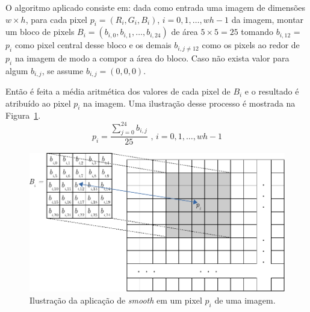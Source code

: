 O algoritmo aplicado consiste em: dada como entrada uma imagem de dimensões $w \times h$, para cada pixel $p_i = (R_i, G_i, B_i)$, $i = 0, 1, \dots, w h - 1$ da imagem, montar um bloco de pixels $B_i = (b_{i,0}, b_{i,1}, \dots, b_{i,24})$ de área $5 \times 5 = 25$ tomando $b_{i,12}$ = $p_i$ como pixel central desse bloco e os demais $b_{i,j \neq 12}$ como os pixels ao redor de $p_i$ na imagem de modo a compor a área do bloco. Caso não exista valor para algum $b_{i,j}$, se assume $b_{i,j} = (0,0,0)$.

Então é feita a média aritmética dos valores de cada pixel de $B_i$ e o resultado é atribuído ao pixel $p_i$ na imagem. Uma ilustração desse processo é mostrada na Figura~\ref{fig:ilustracao}.
\begin{equation}
	p_i = \frac{\sum_{j = 0}^{24} b_{i,j}}{25} \text{ , } i = 0, 1, \dots, w h - 1 \label{eq:aritmetica}
\end{equation}


\begin{figure}[h]
	\centering
	\includegraphics[scale=1]{./input/smooth.pdf}
	\caption{Ilustração da aplicação de \textit{smooth} em um pixel $p_i$ de uma imagem. \label{fig:ilustracao}}
\end{figure}


